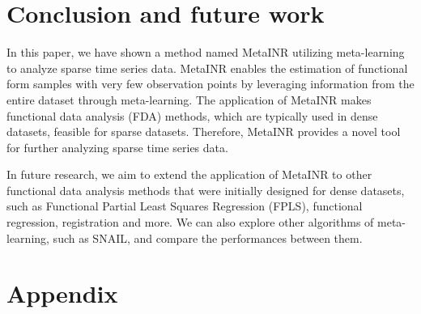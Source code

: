 \documentclass{article}
\begin{document}
\section{Conclusion and future work}
In this paper, we have shown a method named MetaINR utilizing meta-learning to analyze sparse time series data. 
MetaINR enables the estimation of functional form samples with very few observation points by leveraging information from the entire dataset through meta-learning. 
The application of MetaINR makes functional data analysis (FDA) methods, which are typically used in dense datasets, feasible for sparse datasets. 
Therefore, MetaINR provides a novel tool for further analyzing sparse time series data.

In future research, we aim to extend the application of MetaINR to other functional data analysis methods that were initially designed for dense datasets, such as Functional Partial Least Squares Regression (FPLS), functional regression, registration and more.
We can also explore other algorithms of meta-learning, such as SNAIL, and compare the performances between them.
\section{Appendix}
\end{document}
